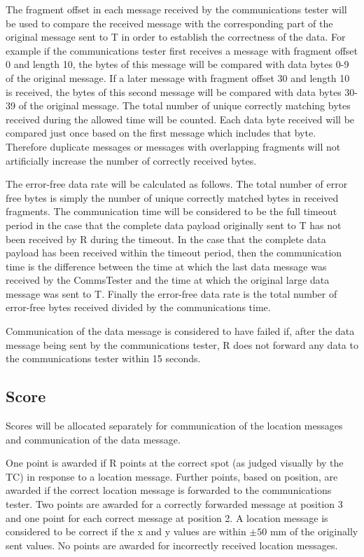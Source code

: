 \documentclass[12pt]{article}
\begin{document}
The fragment offset in each message received by the communications tester will be used to compare the received message with the corresponding part of the original message sent to T in order to establish the correctness of the data. For example if the communications tester first receives a message with fragment offset 0 and length 10, the bytes of this message will be compared with data bytes 0-9 of the original message. If a later message with fragment offset 30 and length 10 is received, the bytes of this second message will be compared with data bytes 30-39 of the original message. The total number of unique correctly matching bytes received during the allowed time
will be counted. Each data byte received will be compared just once based on the first message which includes that byte. Therefore duplicate messages or messages with overlapping fragments will not artificially increase the number of correctly received bytes.

The error-free data rate will be calculated as follows. The total number of error free bytes is simply the number of unique correctly matched bytes in received fragments. The communication time will be considered to be the full timeout period in the case that the complete data payload originally sent to T has not been received by R during the timeout. In the case that the complete data payload has been received within the timeout period, then the communication time is the difference between the time at which the last data message was received by the CommsTester and the time at which the original large data message was sent to T. Finally the error-free data rate is the total number of error-free bytes received divided by the communications time.

Communication of the data message is considered to have failed if, after the data message being sent by the communications tester, R does not forward any data to the communications tester within 15 seconds.

\subsection{Score}
Scores will be allocated separately for communication of the location messages and communication of the data message.

One point is awarded if R points at the correct spot (as judged visually by the TC) in response to a location message. Further points, based on position, are awarded if the correct location message is forwarded to the communications tester. Two points are awarded for a correctly forwarded message at position 3 and one point for each correct message at position 2. A location message is considered to be correct if the x and y values are within $\pm50$ mm of the originally sent values. No points are awarded for incorrectly received location messages.
\end{document}
